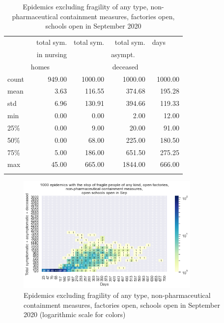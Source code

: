 \documentclass[graybox]{svmult}
\begin{document}
\begin{table}[t]
\center
\small
\begin{tabular}{lrrrr}
\hline\noalign{\smallskip}
{} & total sym.        &  total sym. & total sym.     & days~~~~ \\
{} & in nursing        &                  & asympt.~~~  & \\
{} & homes~~~~~  &                  & deceased~~ & \\
\noalign{\smallskip}\svhline\noalign{\smallskip}
count &     949.00 &             1000.00 &                 1000.00 & 1000.00 \\
mean  &       3.63 &              116.55 &                  374.68 &  195.28 \\
std   &       6.96 &              130.91 &                  394.66 &  119.33 \\
min   &       0.00 &                0.00 &                    2.00 &   12.00 \\
25\%   &       0.00 &                9.00 &                   20.00 &   91.00 \\
50\%   &       0.00 &               68.00 &                  225.00 &  180.50 \\
75\%   &       5.00 &              186.00 &                  651.50 &  275.25 \\
max   &      45.00 &              665.00 &                 1844.00 &  666.00 \\
\hline\noalign{\smallskip}
\end{tabular}

\label{EpidemicsNoAllFragileFacsOnSchOnT}
\caption{Epidemics excluding fragility of any type, non-pharmaceutical containment measures, factories open, schools open in September 2020}
\end{table}


\begin{figure}[t]
\begin{center}
\includegraphics[width=0.8\textwidth]{HM30_readRunResults1k_with_NoAllFrag_openFacs_at20_openSchoolSep_plusHMlog.png}
\caption{Epidemics excluding fragility of any type, non-pharmaceutical containment measures, factories open, schools open in September 2020 (logarithmic scale for colors)}
\label{EpidemicsNoAllFragileFacsOnSchOnHM}
\end{center}
\end{figure}
\end{document}
